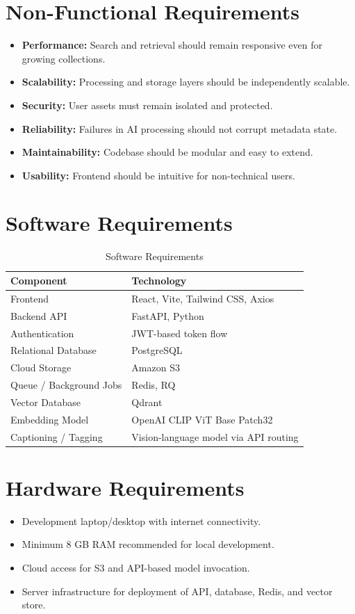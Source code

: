 \documentclass[12pt,a4paper]{report}
\begin{document}
\section{Non-Functional Requirements}
\begin{itemize}[leftmargin=*]
    \item \textbf{Performance:} Search and retrieval should remain responsive even for growing collections.
    \item \textbf{Scalability:} Processing and storage layers should be independently scalable.
    \item \textbf{Security:} User assets must remain isolated and protected.
    \item \textbf{Reliability:} Failures in AI processing should not corrupt metadata state.
    \item \textbf{Maintainability:} Codebase should be modular and easy to extend.
    \item \textbf{Usability:} Frontend should be intuitive for non-technical users.
\end{itemize}

\section{Software Requirements}
\begin{table}[H]
\centering
\caption{Software Requirements}
\begin{tabularx}{\textwidth}{|l|X|}
\hline
\textbf{Component} & \textbf{Technology} \\
\hline
Frontend & React, Vite, Tailwind CSS, Axios \\
\hline
Backend API & FastAPI, Python \\
\hline
Authentication & JWT-based token flow \\
\hline
Relational Database & PostgreSQL \\
\hline
Cloud Storage & Amazon S3 \\
\hline
Queue / Background Jobs & Redis, RQ \\
\hline
Vector Database & Qdrant \\
\hline
Embedding Model & OpenAI CLIP ViT Base Patch32 \\
\hline
Captioning / Tagging & Vision-language model via API routing \\
\hline
\end{tabularx}
\end{table}

\section{Hardware Requirements}
\begin{itemize}[leftmargin=*]
    \item Development laptop/desktop with internet connectivity.
    \item Minimum 8 GB RAM recommended for local development.
    \item Cloud access for S3 and API-based model invocation.
    \item Server infrastructure for deployment of API, database, Redis, and vector store.
\end{itemize}
\end{document}
